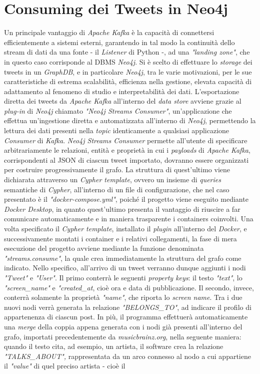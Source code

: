 \documentclass[12pt, a4paper, twocolumn]{article} %
\begin{document}
\section{Consuming dei Tweets in Neo4j}
Un principale vantaggio di \textit{Apache Kafka} è la capacità di connettersi efficientemente a sistemi esterni, garantendo in tal modo la continuità dello stream di dati da una fonte - il \textit{Listener} di Python -, ad una \textit{"landing zone"}, che in questo caso corrisponde al DBMS \textit{Neo4j}. Si è scelto di effettuare lo \textit{storage} dei tweets in un \textit{GraphDB}, e in particolare \textit{Neo4j}, tra le varie motivazioni, per le sue caratteristiche di estrema scalabilità, efficienza nella gestione, elevata capacità di adattamento al fenomeno di studio e interpretabilità dei dati. L'esportazione diretta dei tweets da \textit{Apache Kafka} all'interno del \textit{data store} avviene grazie al \textit{plug-in} di \textit{Neo4j} chiamato \textit{"Neo4j Streams Consumer"}, un'applicazione che effettua un'ingestione diretta e automatizzata all'interno di \textit{Neo4j}, permettendo la lettura dei dati presenti nella \textit{topic} identicamente a qualsiasi applicazione \textit{Consumer} di \textit{Kafka}. \textit{Neo4j Streams Consumer} permette all'utente di specificare arbitrariamente le relazioni, entità e proprietà in cui i \textit{payloads} di \textit{Apache Kafka}, corrispondenti al JSON di ciascun tweet importato, dovranno essere organizzati per costruire progressivamente il grafo. La struttura di quest'ultimo viene dichiarata attraverso un \textit{Cypher template}, ovvero un insieme di \textit{queries} semantiche di \textit{Cypher}, all'interno di un file di configurazione, che nel caso presentato è il \textit{"docker-compose.yml"}, poiché il progetto viene eseguito mediante \textit{Docker Desktop}, in quanto quest'ultimo presenta il vantaggio di riuscire a far comunicare automaticamente e in maniera trasparente i containers coinvolti. Una volta specificato il \textit{Cypher template}, installato il \textit{plugin} all'interno del \textit{Docker}, e successivamente montati i container e i relativi collegamenti, la fase di mera esecuzione del progetto avviene mediante la funzione denominata \textit{"streams.consume"}, la quale crea immediatamente la struttura del grafo come indicato. Nello specifico, all'arrivo di un tweet verranno dunque aggiunti i nodi \textit{"Tweet"} e \textit{"User"}. Il primo conterrà le seguenti \textit{property keys}: il testo \textit{"text"}, lo \textit{"screen\_name"} e \textit{"created\_at}, cioè ora e data di pubblicazione. Il secondo, invece, conterrà solamente la proprietà \textit{"name"}, che riporta lo \textit{screen name}. Tra i due nuovi nodi verrà generata la relazione \textit{"BELONGS\_TO"}, ad indicare il profilo di appartenenza di ciascun post. In più, il programma effettuerà automaticamente una \textit{merge} della coppia appena generata con i nodi già presenti all'interno del grafo, importati precedentemente da \textit{musicbrainz.org}, nella seguente maniera: quando il testo cita, ad esempio, un artista, il software crea la relazione \textit{"TALKS\_ABOUT",} rappresentata da un arco connesso al nodo a cui appartiene il \textit{"value"} di quel preciso artista - cioè il 
\end{document}
